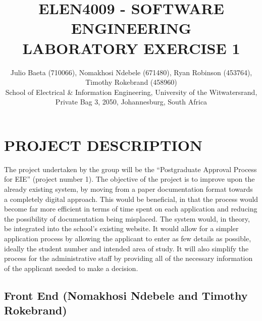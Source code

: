 \documentclass[journal,comsoc]{IEEEtran}
\begin{document}
\title{ELEN4009 - SOFTWARE ENGINEERING\\ LABORATORY EXERCISE 1}

\author{\vspace{3mm} Julio Baeta (710066), Nomakhosi Ndebele (671480), Ryan Robinson (453764), Timothy Rokebrand (458960)\\ \small \vspace{2mm} School of Electrical \& Information Engineering, University of the Witwatersrand, Private Bag 3, 2050, Johannesburg, South Africa
}

\markboth{}{}

\maketitle

\thispagestyle{empty}
\pagestyle{empty}

\IEEEpeerreviewmaketitle


\section{PROJECT DESCRIPTION}

The project undertaken by the group will be the ``Postgraduate Approval Process for EIE'' (project number 1). The objective of the project is to improve upon the already existing system, by moving from a paper documentation format towards a completely digital approach. This would be beneficial, in that the process would become far more efficient in terms of time spent on each application and reducing the possibility of documentation being misplaced. The system would, in theory, be integrated into the school's existing website. It would allow for a simpler application process by allowing the applicant to enter as few details as possible, ideally the student number and intended area of study. It will also simplify the process for the administrative staff by providing all of the necessary information of the applicant needed to make a decision.


\subsection{Front End (Nomakhosi Ndebele and Timothy Rokebrand)}
\end{document}
